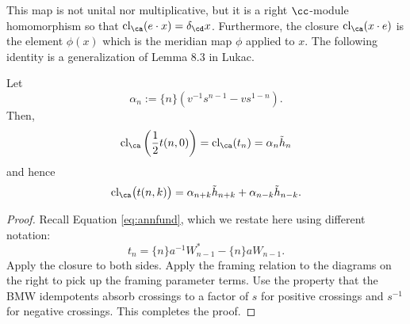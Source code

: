 This map is not unital nor multiplicative, but it is a right $\cc$-module homomorphism so that $\cl_\ca(e \cdot x) = \delta_\cd x$. Furthermore, the closure $\cl_\ca(x \cdot e)$ is the element $\phi(x)$ which is the meridian map $\phi$ applied to $x$. The following identity is a generalization of Lemma 8.3 in Lukac.

\begin{lemma} \label{lemma:tclosure}
Let 
\[
\alpha_n := \{ n \} \left( v^{-1} s^{n - 1} - v s^{1 - n} \right).
\] 
Then, 
\[
\textrm{cl}_\ca \left( \frac{1}{2} t(n,0) \right) = \textrm{cl}_\ca (t_n) = \alpha_n \tilde{h}_n
\]
and hence 
\[
\textrm{cl}_\ca \big( t(n, k) \big) = \alpha_{n+k} \tilde{h}_{n+k} + \alpha_{n-k} \tilde{h}_{n-k}.
\]
\end{lemma}
\begin{proof}
Recall Equation \eqref{eq:annfund}, which we restate here using different notation:
\[
t_n = \{ n \} a^{-1}W^*_{n - 1} - \{ n \} aW_{n - 1}.
\]
Apply the closure to both sides. Apply the framing relation to the diagrams on the right to pick up the framing parameter terms. Use the property that the BMW idempotents absorb crossings to a factor of $s$ for positive crossings and $s^{-1}$ for negative crossings. This completes the proof. 
\end{proof}

